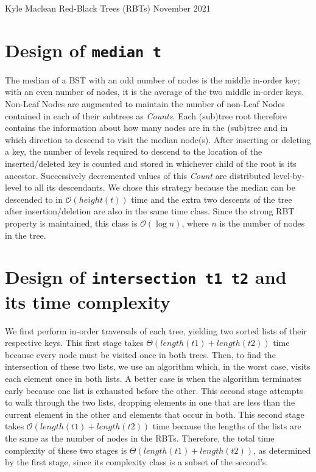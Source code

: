 \documentclass{article}
\begin{document}
Kyle Maclean
\newline
Red-Black Trees (RBTs)
\newline
November 2021

\cprotect\section{{Design of \verb+median t+}}

The median of a BST with an odd number of nodes is the middle in-order key; with an even number of nodes, it is the average of the two middle in-order keys. Non-Leaf Nodes are augmented to maintain the number of non-Leaf Nodes contained in each of their subtrees as \textit{Counts}. Each (sub)tree root therefore contains the information about how many nodes are in the (sub)tree and in which direction to descend to visit the median node(s). After inserting or deleting a key, the number of levels required to descend to the location of the inserted/deleted key is counted and stored in whichever child of the root is its ancestor. Successively decremented values of this \textit{Count} are distributed level-by-level to all its descendants. We chose this strategy because the median can be descended to in $\mathcal{O}(height(t))$ time and the extra two descents of the tree after insertion/deletion are also in the same time class. Since the strong RBT property is maintained, this class is $\mathcal{O}(\log{n})$, where $n$ is the number of nodes in the tree.

\cprotect\section{Design of \verb+intersection t1 t2+ and its time complexity}

We first perform in-order traversals of each tree, yielding two sorted lists of their respective keys. This first stage takes $\Theta(length(t1) + length(t2))$ time because every node must be visited once in both trees. Then, to find the intersection of these two lists, we use an algorithm which, in the worst case, visits each element once in both lists. A better case is when the algorithm terminates early because one list is exhausted before the other. This second stage attempts to  walk through the two lists, dropping elements in one that are less than the current element in the other and  elements that occur in both. This second stage takes $\mathcal{O}(length(t1) + length(t2))$ time because the lengths of the lists are the same as the number of nodes in the RBTs. Therefore, the total time complexity of these two stages is $\Theta(length(t1) + length(t2))$, as determined by the first stage, since its complexity class is a subset of the second's.
\end{document}
